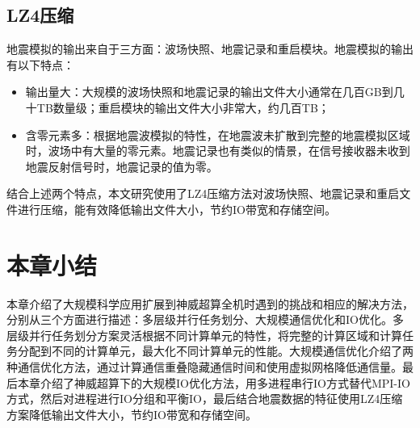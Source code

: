 \subsection{LZ4压缩}

地震模拟的输出来自于三方面：波场快照、地震记录和重启模块。地震模拟的输出有以下特点：
\begin{itemize}
  \item 输出量大：大规模的波场快照和地震记录的输出文件大小通常在几百GB到几十TB数量级；重启模块的输出文件大小非常大，约几百TB；
  \item 含零元素多：根据地震波模拟的特性，在地震波未扩散到完整的地震模拟区域时，波场中有大量的零元素。地震记录也有类似的情景，在信号接收器未收到地震反射信号时，地震记录的值为零。
\end{itemize}

结合上述两个特点，本文研究使用了LZ4压缩方法对波场快照、地震记录和重启文件进行压缩，能有效降低输出文件大小，节约IO带宽和存储空间。

\section{本章小结}

本章介绍了大规模科学应用扩展到神威超算全机时遇到的挑战和相应的解决方法，分别从三个方面进行描述：多层级并行任务划分、大规模通信优化和IO优化。多层级并行任务划分方案灵活根据不同计算单元的特性，将完整的计算区域和计算任务分配到不同的计算单元，最大化不同计算单元的性能。大规模通信优化介绍了两种通信优化方法，通过计算通信重叠隐藏通信时间和使用虚拟网格降低通信量。最后本章介绍了神威超算下的大规模IO优化方法，用多进程串行IO方式替代MPI-IO方式，然后对进程进行IO分组和平衡IO，最后结合地震数据的特征使用LZ4压缩方案降低输出文件大小，节约IO带宽和存储空间。

